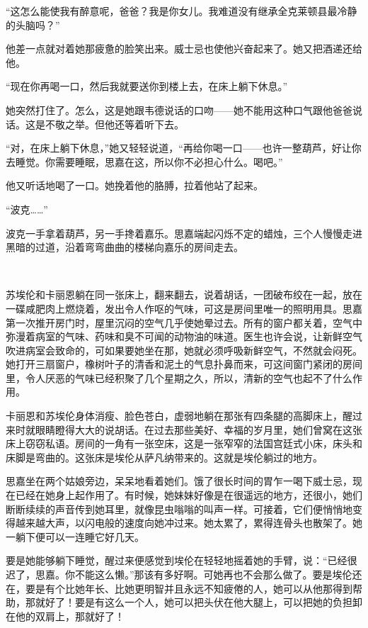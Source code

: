 \par “这怎么能使我有醉意呢，爸爸？我是你女儿。我难道没有继承全克莱顿县最冷静的头脑吗？”
\par 他差一点就对着她那疲惫的脸笑出来。威士忌也使他兴奋起来了。她又把酒递还给他。
\par “现在你再喝一口，然后我就要送你到楼上去，在床上躺下休息。”
\par 她突然打住了。怎么，这是她跟韦德说话的口吻——她不能用这种口气跟他爸爸说话。这是不敬之举。但他还等着听下去。
\par “对，在床上躺下休息，”她又轻轻说道，“再给你喝一口——也许一整葫芦，好让你去睡觉。你需要睡眠，思嘉在这，所以你不必担心什么。喝吧。”
\par 他又听话地喝了一口。她挽着他的胳膊，拉着他站了起来。
\par “波克……”
\par 波克一手拿着葫芦，另一手搀着嘉乐。思嘉端起闪烁不定的蜡烛，三个人慢慢走进黑暗的过道，沿着弯弯曲曲的楼梯向嘉乐的房间走去。
\par  
\par 苏埃伦和卡丽恩躺在同一张床上，翻来翻去，说着胡话，一团破布绞在一起，放在一碟咸肥肉上燃烧着，发出令人作呕的气味，可这是房间里唯一的照明用具。思嘉第一次推开房门时，屋里沉闷的空气几乎使她晕过去。所有的窗户都关着，空气中弥漫着病室的气味、药味和臭不可闻的动物油的味道。医生也许会说，让新鲜空气吹进病室会致命的，可如果要她坐在那，她就必须呼吸新鲜空气，不然就会闷死。她打开三扇窗户，橡树叶子的清香和泥土的气息扑鼻而来，可这间窗门紧闭的房间里，令人厌恶的气味已经积聚了几个星期之久，所以，清新的空气也起不了什么作用。
\par 卡丽恩和苏埃伦身体消瘦、脸色苍白，虚弱地躺在那张有四条腿的高脚床上，醒过来时就眼睛瞪得大大的说胡话。在过去那些美好、幸福的岁月里，她们曾窝在这张床上窃窃私语。房间的一角有一张空床，这是一张窄窄的法国宫廷式小床，床头和床脚是弯曲的。这张床是埃伦从萨凡纳带来的。这就是埃伦躺过的地方。
\par 思嘉坐在两个姑娘旁边，呆呆地看着她们。饿了很长时间的胃乍一喝下威士忌，现在已经在她身上起作用了。有时候，她妹妹好像是在很遥远的地方，还很小，她们断断续续的声音传到她耳里，就像昆虫嗡嗡的叫声一样。可接着，它们便悄悄地变得越来越大声，以闪电般的速度向她冲过来。她太累了，累得连骨头也散架了。她一躺下便可以一连睡它好几天。
\par 要是她能够躺下睡觉，醒过来便感觉到埃伦在轻轻地摇着她的手臂，说：“已经很迟了，思嘉。你不能这么懒。”那该有多好啊。可她再也不会那么做了。要是埃伦还在，要是有个比她年长、比她更明智并且永远不知疲倦的人，她可以从他那得到帮助，那就好了！要是有这么一个人，她可以把头伏在他大腿上，可以把她的负担卸在他的双肩上，那就好了！
